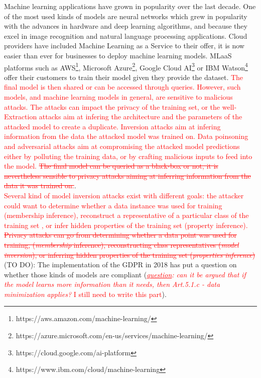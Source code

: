 \documentclass[11pt]{article}
\begin{document}
    Machine learning applications have grown in popularity over the last decade. One of the most used kinds of models are neural networks which grew in popularity with the advances in hardware and deep learning algorithms, and because they excel in image recognition and natural language processing applications. Cloud providers have included Machine Learning as a Service to their offer, it is now easier than ever for businesses to deploy machine learning models. MLaaS platforms such as AWS\footnote{https://aws.amazon.com/machine-learning/}, Microsoft Azure\footnote{https://azure.microsoft.com/en-us/services/machine-learning/}, Google Cloud AI\footnote{https://cloud.google.com/ai-platform} or IBM Watson\footnote{https://www.ibm.com/cloud/machine-learning} offer their customers to train their model given they provide the dataset. \textcolor{red}{The final model is then shared or can be accessed through queries. However, such models, and machine learning models in general, are sensitive to malicious attacks. The attacks can impact the privacy of the training set, or the well-Extraction attacks aim at infering the architecture and the parameters of the attacked model to create a duplicate. Inversion attacks aim at infering information from the data the attacked model was trained on. Data poinsoning and adversarial attacks aim at compromising the attacked model predictions either by polluting the training data, or by crafting malicious inputs to feed into the model.
    \sout{The final model can be queried as a black-box or not, it is nevertheless sensible to privacy attacks aiming at inferring information from the data it was trained on.}}.\\
    \textcolor{red}{Several kind of model inversion attacks exist with different goals: the attacker could want to determine whether a data instance was used for training (membership inference)\cite{Shokri2017, Salem2019}, reconstruct a representative of a particular class of the training set \cite{Fredrikson2015}, or infer hidden properties of the training set (property inference)\cite{Ganju2018}. \sout{Privacy attacks can go from determining whether a data point was used for training,  (\textit{membership} inference), reconstructing class representatives (\textit{model inversion}), or inferring hidden properties of the training set (\textit{properties inference})}}\\
    
    (TO DO): The implementation of the GDPR in 2018 has put a question on whether those kinds of models are compliant (\textcolor{red}{\textit{\underline{question}: can it be argued that if the model learns more information than it needs, then Art.5.1.c - data minimization applies?} I still need to write this part}).\\
    
\end{document}
